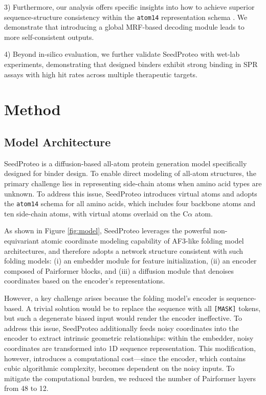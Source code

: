 \documentclass[]{bytedance_seed}
\begin{document}
3) Furthermore, our analysis offers specific insights into how to achieve superior sequence-structure consistency within the \texttt{atom14} representation schema \cite{quPallatomUnlockingNew2025, butcher2025novo, starkUniversalBinderDesign}. We demonstrate that introducing a global MRF-based decoding module leads to more self-consistent outputs.


4) Beyond in-silico evaluation, we further validate SeedProteo with wet-lab experiments, demonstrating that designed binders exhibit strong binding in SPR assays with high hit rates across multiple therapeutic targets.




\section{Method}
\subsection{Model Architecture}
SeedProteo is a diffusion-based all-atom protein generation model specifically designed for binder design. To enable direct modeling of all-atom structures, the primary challenge lies in representing side-chain atoms when amino acid types are unknown. To address this issue, SeedProteo introduces virtual atoms and adopts the \texttt{atom14} schema \cite{quPallatomUnlockingNew2025} for all amino acids, which includes four backbone atoms and ten side-chain atoms, with virtual atoms overlaid on the C$\alpha$ atom.

As shown in Figure \ref{fig:model}, SeedProteo leverages the powerful non-equivariant atomic coordinate modeling capability of AF3-like folding model architectures, and therefore adopts a network structure consistent with such folding models: (i) an embedder module for feature initialization, (ii) an encoder composed of Pairformer blocks, and (iii) a diffusion module that denoises coordinates based on the encoder's representations.

However, a key challenge arises because the folding model's encoder is sequence-based. A trivial solution would be to replace the sequence with all \texttt{[MASK]} tokens, but such a degenerate biased input would render the encoder ineffective. To address this issue, SeedProteo additionally feeds noisy coordinates into the encoder to extract intrinsic geometric relationships: within the embedder, noisy coordinates are transformed into 1D sequence representation. This modification, however, introduces a computational cost—since the encoder, which contains cubic algorithmic complexity, becomes dependent on the noisy inputs. To mitigate the computational burden, we reduced the number of Pairformer layers from 48 to 12.
\end{document}
